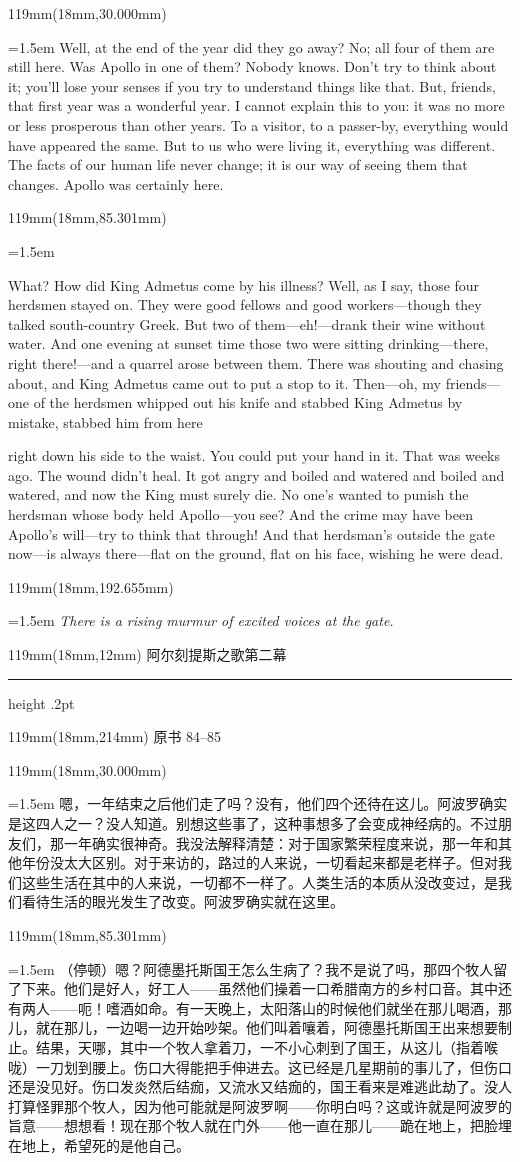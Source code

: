 \documentclass{article}
\newcommand{\ENsetup}{\normalfont\color{ink}\fontsize{11}{16.5}\selectfont\emergencystretch=1.5em}
\newcommand{\ZHsetup}{\normalfont\color{ink}\fontsize{10.5}{17}\selectfont\emergencystretch=1.5em}
\newcommand{\ENstage}[1]{\par\noindent{\itshape #1}\par}
\newcommand{\Block}[3]{\begin{textblock*}{119mm}(18mm,#1mm){#2 #3\par}\end{textblock*}}
\newcommand{\Heading}[3]{%
  \begin{textblock*}{119mm}(18mm,12mm)
    \color{quiet}\fontsize{7.5}{10}\selectfont
    #1\hfill #2\par\vspace{3mm}\hrule height .2pt
  \end{textblock*}
  \begin{textblock*}{119mm}(18mm,214mm)
    \color{quiet}\fontsize{7}{10}\selectfont #3\hfill\thepage
  \end{textblock*}
}
\begin{document}
\Block{30.000}{\ENsetup}{Well, at the end of the year did they go away? No; all four of them are still here. Was Apollo in one of them? Nobody knows. Don't try to think about it; you'll lose your senses if you try to understand things like that. But, friends, that first year was a wonderful year. I cannot explain this to you: it was no more or less prosperous than other years. To a visitor, to a passer-by, everything would have appeared the same. But to us who were living it, everything was different. The facts of our human life never change; it is our way of seeing them that changes. Apollo was certainly here.\par}
\Block{85.301}{\ENsetup}{\ENstage{Pause.}
What? How did King Admetus come by his illness? Well, as I say, those four herdsmen stayed on. They were good fellows and good workers—though they talked south-country Greek. But two of them—eh!—drank their wine without water. And one evening at sunset time those two were sitting drinking—there, right there!—and a quarrel arose between them. There was shouting and chasing about, and King Admetus came out to put a stop to it. Then—oh, my friends—one of the herdsmen whipped out his knife and stabbed King Admetus by mistake, stabbed him from here\par
\ENstage{Points to his throat.}
right down his side to the waist. You could put your hand in it. That was weeks ago. The wound didn't heal. It got angry and boiled and watered and boiled and watered, and now the King must surely die. No one's wanted to punish the herdsman whose body held Apollo—you see? And the crime may have been Apollo's will—try to think that through! And that herdsman's outside the gate now—is always there—flat on the ground, flat on his face, wishing he were dead.\par}
\Block{192.655}{\ENsetup}{\itshape 
There is a rising murmur of excited voices at the gate.\par}
\newpage
\null
\Heading{阿尔刻提斯之歌}{第二幕}{原书 84–85}
\Block{30.000}{\ZHsetup}{嗯，一年结束之后他们走了吗？没有，他们四个还待在这儿。阿波罗确实是这四人之一？没人知道。别想这些事了，这种事想多了会变成神经病的。不过朋友们，那一年确实很神奇。我没法解释清楚：对于国家繁荣程度来说，那一年和其他年份没太大区别。对于来访的，路过的人来说，一切看起来都是老样子。但对我们这些生活在其中的人来说，一切都不一样了。人类生活的本质从没改变过，是我们看待生活的眼光发生了改变。阿波罗确实就在这里。\par }
\Block{85.301}{\ZHsetup}{{\kai （停顿）}嗯？阿德墨托斯国王怎么生病了？我不是说了吗，那四个牧人留了下来。他们是好人，好工人——虽然他们操着一口希腊南方的乡村口音。其中还有两人——呃！嗜酒如命。有一天晚上，太阳落山的时候他们就坐在那儿喝酒，那儿，就在那儿，一边喝一边开始吵架。他们叫着嚷着，阿德墨托斯国王出来想要制止。结果，天哪，其中一个牧人拿着刀，一不小心刺到了国王，从这儿{\kai （指着喉咙）}一刀划到腰上。伤口大得能把手伸进去。这已经是几星期前的事儿了，但伤口还是没见好。伤口发炎然后结痂，又流水又结痂的，国王看来是难逃此劫了。没人打算怪罪那个牧人，因为他可能就是阿波罗啊——你明白吗？这或许就是阿波罗的旨意——想想看！现在那个牧人就在门外——他一直在那儿——跪在地上，把脸埋在地上，希望死的是他自己。\par }
\end{document}
